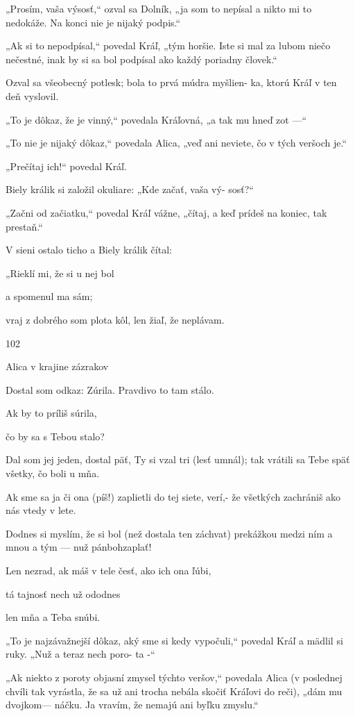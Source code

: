 \documentclass[12pt]{article}
\begin{document}
\begin{Parallel}[p]{}{}
{{„Prosím, vaša výsosť,“ ozval sa Dolník, „ja som to nepísal
a nikto mi to nedokáže. Na konci nie je nijaký podpis.“

„Ak si to nepodpísal,“ povedal Kráľ, „tým horšie. Iste si
mal za lubom niečo nečestné, inak by si sa bol podpísal ako
každý poriadny človek.“

Ozval sa všeobecný potlesk; bola to prvá múdra myšlien-
ka, ktorú Kráľ v ten deň vyslovil.

„To je dôkaz, že je vinný,“ povedala Kráľovná, „a tak
mu hneď zot —“

„To nie je nijaký dôkaz,“ povedala Alica, „veď ani
neviete, čo v tých veršoch je.“

„Prečítaj ich!“ povedal Kráľ.

Biely králik si založil okuliare: „Kde začať, vaša vý-
sosť?“

„Začni od začiatku,“ povedal Kráľ vážne, „čítaj, a keď
prídeš na koniec, tak prestaň.“

V sieni ostalo ticho a Biely králik čítal:

„Rieklí mi, že si u nej bol

a spomenul ma sám;

vraj z dobrého som plota kôl,
len žiaľ, že neplávam.

102

Alica v krajine zázrakov

Dostal som odkaz: Zúrila.
Pravdivo to tam stálo.

Ak by to príliš súrila,

čo by sa s Tebou stalo?

Dal som jej jeden, dostal päť,
Ty si vzal tri (lesť umnál);
tak vrátili sa Tebe späť
všetky, čo boli u mňa.

 

Ak sme sa ja či ona (píš!)
zaplietli do tej siete,
verí,- že všetkých zachrániš
ako nás vtedy v lete.

Dodnes si myslím, že si bol
(než dostala ten záchvat)
prekážkou medzi ním a mnou
a tým — nuž pánbohzaplať!

Len nezrad, ak máš v tele česť,
ako ich ona ľúbi,

tá tajnosť nech už ododnes

len mňa a Teba snúbi.

„To je najzávažnejší dôkaz, aký sme si kedy vypočuli,“
povedal Kráľ a mädlil si ruky. „Nuž a teraz nech poro-
ta -“

„Ak niekto z poroty objasní zmysel týchto veršov,“
povedala Alica (v poslednej chvíli tak vyrástla, že sa už ani
trocha nebála skočiť Kráľovi do reči), „dám mu dvojkom—
náčku. Ja vravím, že nemajú ani byľku zmyslu.“

}}
\end{Parallel}
\end{document}
